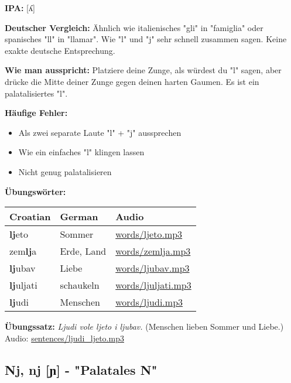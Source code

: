\begin{tcolorbox}[breakable, colback=lightgreen!30, colframe=green!60!black, title=\textbf{Lj, lj}]

\textbf{IPA:} [ʎ]

\textbf{Deutscher Vergleich:}
Ähnlich wie italienisches "gli" in "famiglia" oder spanisches "ll" in "llamar". Wie "l" und "j" sehr schnell zusammen sagen. Keine exakte deutsche Entsprechung.

\textbf{Wie man ausspricht:}
Platziere deine Zunge, als würdest du "l" sagen, aber drücke die Mitte deiner Zunge gegen deinen harten Gaumen. Es ist ein palatalisiertes "l".

\textbf{Häufige Fehler:}
\begin{itemize}
    \item Als zwei separate Laute "l" + "j" aussprechen
    \item Wie ein einfaches "l" klingen lassen
    \item Nicht genug palatalisieren
\end{itemize}

\textbf{Übungswörter:}
\begin{center}
\small
\begin{tabular}{lll}
\textbf{Croatian} & \textbf{German} & \textbf{Audio} \\
\midrule
\textbf{lj}eto & Sommer & \small\url{words/ljeto.mp3} \\
zem\textbf{lj}a & Erde, Land & \small\url{words/zemlja.mp3} \\
\textbf{lj}ubav & Liebe & \small\url{words/ljubav.mp3} \\
\textbf{lj}uljati & schaukeln & \small\url{words/ljuljati.mp3} \\
\textbf{lj}udi & Menschen & \small\url{words/ljudi.mp3} \\
\end{tabular}
\end{center}

\textbf{Übungssatz:}
\textit{Ljudi vole ljeto i ljubav.}
(Menschen lieben Sommer und Liebe.)
Audio: \small\url{sentences/ljudi\_ljeto.mp3}

\end{tcolorbox}

\subsection{Nj, nj [ɲ] - "Palatales N"}

